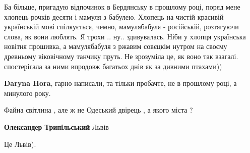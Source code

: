 \begin{itemize}
Ба більше, пригадую відпочинок в Бердянську в прошлому році, поряд мене хлопець
рочків десяти і мамуля з бабулею. Хлопець на чистій красивій українській мові
спілкується, чемно, мамулябабуля - російській, розтягуючи слова, як вони
люблять. Я трохи .. ну.. здивувалась.  Ніби у хлопця українська новітня
прошивка, а мамулябабуля з ржавим совєцкім
нутром на своєму древньому віковічному танчику пруть. Не зрозуміла це, як воно
так взагалі. спостерігала за ними впродовж багатьох днів як за дивними
птахами))

\begin{itemize}
 
\textbf{Daryna Hora}, гарно написали, та тільки пробачте, не в прошлому році, а минулого року.
\end{itemize}

 
Файна світлина , але ж не Одеський двірець , а якого міста ?

\begin{itemize}
 
\textbf{Олександер Трипільський} Львів

 
Це Львів).

 

\end{itemize}
\end{itemize}
